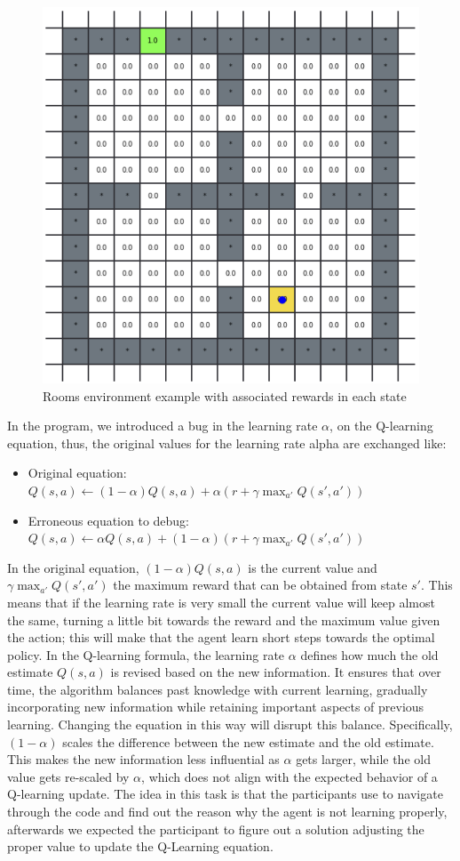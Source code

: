 \begin{figure}[hptb]
  \centering
  \includegraphics[width=0.5\columnwidth]{figures/rooms.png}
  \caption{Rooms environment example with associated rewards in each state}
  \label{fig:rooms}
\end{figure}

In the program, we introduced a bug in the learning rate $\alpha$, on the Q-learning equation, thus,  the original values for the learning rate alpha are exchanged like:

\begin{itemize}
\item Original equation:
$
Q(s, a) \leftarrow (1-\alpha) Q(s, a) + \alpha \left( r + \gamma \max_{a'} Q(s', a') \right)
$

\item Erroneous equation to debug:
$
Q(s, a) \leftarrow  \alpha Q(s, a) + (1-\alpha) \left( r + \gamma \max_{a'} Q(s', a') \right)
$
\end{itemize}

In the original equation,  $(1-\alpha) Q(s, a)$ is the current value and $\gamma \max_{a'} Q(s', a')$ 
the maximum reward that can be obtained from state $s'$. This means that if the learning rate is very 
small the current value will keep almost the same, turning a little bit towards the reward and the 
maximum value given the action; this will make that the agent learn short steps towards the 
optimal policy. In the Q-learning formula, the learning rate $\alpha$ defines how much the old estimate $Q(s,a)$ 
is revised based on the new information. It ensures that over time, the algorithm balances past 
knowledge with current learning, gradually incorporating new information while retaining important 
aspects of previous learning. Changing the equation in this way will disrupt this balance. Specifically,
$(1-\alpha)$ scales the difference between the new estimate and the old estimate. This makes the new information less influential as $\alpha$ gets larger, while the old value gets re-scaled by $\alpha$,  which does not align with the expected behavior of a Q-learning update. The idea in this task is that the participants use \flik to navigate through the code and find out the reason why the agent is not learning properly, afterwards we expected the participant to figure out a solution adjusting the proper value to update the Q-Learning equation.

